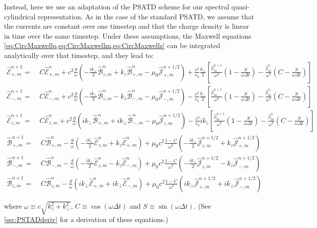 \documentclass[1p,times,authoryear]{elsarticle}
\newcommand{\tB}[2]{\spectral{B}_{#1,m}^{#2}}
\newcommand{\tE}[2]{\spectral{E}_{#1,m}^{#2}}
\newcommand{\tj}[2]{\spectral{J}_{#1,m}^{#2}}
\newcommand{\trho}[1]{\spectral{\rho}_{m}^{#1}}
\newcommand{\spectral}[1]{\hat{\mathcal{#1}}}
\begin{document}
Instead, here we use an adaptation of the PSATD scheme \citep{Haber}
for our spectral quasi-cylindrical representation. As in the case of the standard
PSATD, we assume that the currents are constant over one timestep and
that the charge density is linear in time over the same timestep. Under these
assumptions, the Maxwell equations \cref{eq:CircMaxwellp,eq:CircMaxwellm,eq:CircMaxwellz} can be integrated
analytically over that timestep, and they lead to:
\begin{align*}
\tE{+}{n+1} = \; & C \tE{+}{n} + 
c^2\frac{S}{\omega}\left(-\frac{ik_\perp }{2} \tB{z}{n} + k_z\tB{+}{n}
- \mu_0 \tj{+}{n+1/2} \right) + \frac{c^2}{\epsilon_0}
\frac{k_\perp}{2}\left[ \frac{\trho{n+1}}{\omega^2}\left(
  1 - \frac{S}{\omega\Delta t}\right) -
\frac{\trho{n}}{\omega^2}\left( C -\frac{S}{\omega\Delta t}\right)\right]  & \\
\tE{-}{n+1} =\; & C \tE{-}{n} +
c^2\frac{S}{\omega}\left(- \frac{ik_\perp }{2} \tB{z}{n} - k_z\tB{-}{n}
- \mu_0 \tj{-}{n+1/2} \right) - \frac{c^2}{\epsilon_0}
\frac{k_\perp}{2}\left[ \frac{\trho{n+1}}{\omega^2}\left(
  1 - \frac{S}{\omega\Delta t}\right) - \frac{\trho{n}}{\omega^2}
\left( C - \frac{S}{\omega\Delta t}\right)\right]  &\\
\tE{z}{n+1} =\; & C \tE{z}{n} + 
c^2\frac{S}{\omega}\left(ik_\perp \tB{+}{n} + ik_\perp \tB{-}{n}
- \mu_0 \tj{z}{n+1/2} \right) - \frac{c^2}{\epsilon_0}
ik_z\left[ \frac{\trho{n+1}}{\omega^2}\left(
  1 - \frac{S}{\omega\Delta t}\right) - \frac{\trho{n}}{\omega^2}
\left( C - \frac{S}{\omega\Delta t}\right)\right]  &
\end{align*}
\begin{align*}
\tB{+}{n+1} = \; & C \tB{+}{n} - 
\frac{S}{\omega}\left(-\frac{ik_\perp }{2} \tE{z}{n} + k_z\tE{+}{n}
\right) + \mu_0 c^2\frac{1-C}{\omega^2} \left( -\frac{ik_\perp }{2}
  \tj{z}{n+1/2} + k_z \tj{+}{n+1/2} \right)& \\
\tB{-}{n+1} =\; & C \tB{-}{n} - 
\frac{S}{\omega}\left(- \frac{ik_\perp }{2} \tE{z}{n} - k_z\tE{-}{n}
\right) + \mu_0 c^2\frac{1-C}{\omega^2} \left( - \frac{ik_\perp }{2}
  \tj{z}{n+1/2} - k_z \tj{-}{n+1/2} \right) &\\
\tB{z}{n+1} =\; & C \tB{z}{n} - 
\frac{S}{\omega}\left(ik_\perp \tE{+}{n} + ik_\perp \tE{-}{n}
\right) + \mu_0 c^2\frac{1-C}{\omega^2} \left( ik_\perp
  \tj{+}{n+1/2} + ik_\perp \tj{-}{n+1/2} \right)&
\end{align*}

\noindent where $\omega \equiv c\sqrt{k_z^2 + k_\perp^2}$, $C \equiv \cos(\omega \Delta t)$
and $S \equiv \sin(\omega \Delta t) $. (See \ref{sec:PSTADderiv} for a
derivation of these equations.)
\end{document}
